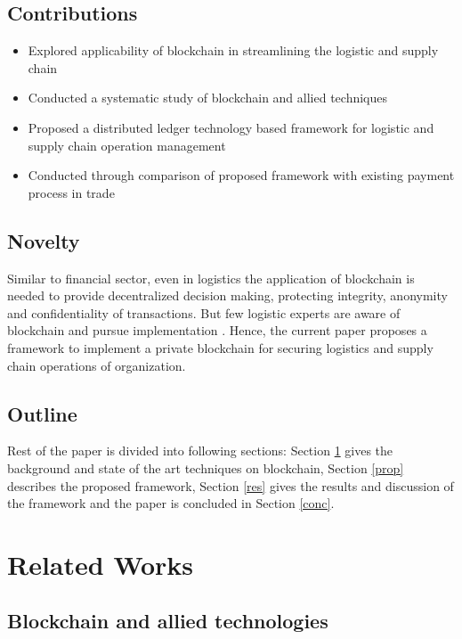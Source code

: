\documentclass[num-refs]{wiley-article}
\begin{document}
\subsection{Contributions}
\begin{itemize}
    \item Explored applicability of blockchain in streamlining the logistic and supply chain
    \item Conducted a systematic study of blockchain and allied techniques 
    \item Proposed a distributed ledger technology based framework for logistic and supply chain operation management
    \item Conducted through comparison of proposed framework with existing payment process in trade
\end{itemize}

\subsection{Novelty}
Similar to financial sector, even in logistics the application of blockchain is needed to provide decentralized decision making, protecting integrity, anonymity and confidentiality of transactions. But few logistic experts are aware of blockchain and pursue implementation \cite{hackius2020translating, hackius2017blockchain}. Hence, the current paper proposes a framework to implement a private blockchain for securing logistics and supply chain operations of organization. 

\subsection{Outline}
Rest of the paper is divided into following sections: Section \ref{litrev} gives the background and state of the art techniques on blockchain, Section \ref{prop} describes the proposed framework, Section \ref{res} gives the results and discussion of the framework and the paper is concluded in Section \ref{conc}.



\section{Related Works} \label{litrev}


 \subsection{Blockchain and allied technologies}
\end{document}
